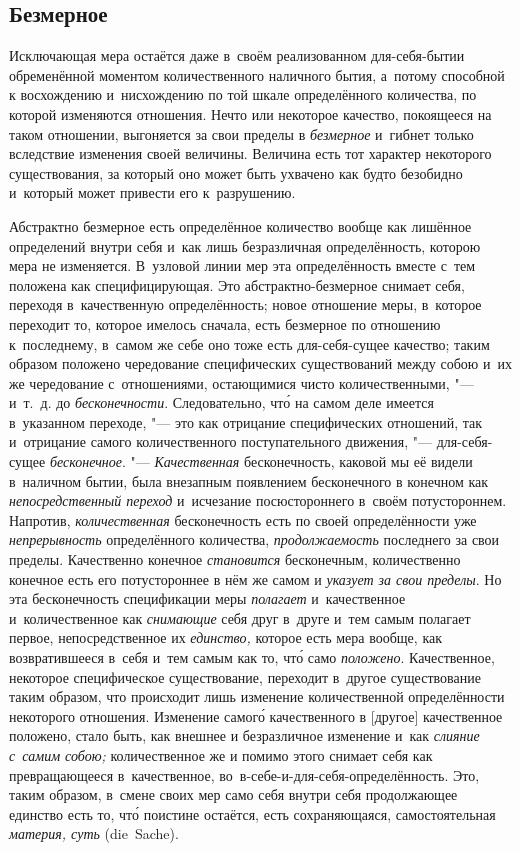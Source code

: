 \subsection{Безмерное}

Исключающая мера остаётся даже в~своём реализованном для-себя-бытии
обременённой моментом количественного наличного бытия, а~потому способной к
восхождению и~нисхождению по той шкале определённого количества, по которой
изменяются отношения. Нечто или некоторое качество, покоящееся на таком
отношении, выгоняется за свои пределы в {\em безмерное} и~гибнет только
вследствие изменения своей величины. Величина есть тот характер некоторого
существования, за который оно может быть ухвачено как будто безобидно и~который
может привести его к~разрушению.

Абстрактно безмерное есть определённое количество вообще как лишённое
определений внутри себя и~как лишь безразличная определённость, которою мера не
изменяется. В~узловой линии мер эта определённость вместе с~тем положена как
специфицирующая. Это абстрактно-безмерное снимает себя, переходя в~качественную
определённость; новое отношение меры, в~которое переходит то, которое имелось
сначала, есть безмерное по отношению к~последнему, в~самом же себе оно тоже
есть для-себя-сущее качество; таким образом положено чередование специфических
существований между собою и~их же чередование с~отношениями, остающимися чисто
количественными, "--- и~т.~д. до {\em бесконечности}. Следовательно, чт\'{о} на
самом деле имеется в~указанном переходе, "--- это как отрицание специфических
отношений, так и~отрицание самого количественного поступательного движения,
"--- для-себя-сущее {\em бесконечное}. "--- {\em Качественная} бесконечность,
каковой мы её видели в~наличном бытии, была внезапным появлением бесконечного в
конечном как {\em непосредственный переход} и~исчезание посюстороннего в~своём
потустороннем. Напротив, {\em количественная} бесконечность есть по своей
определённости уже {\em непрерывность} определённого количества,
{\em продолжаемость} последнего за свои пределы. Качественно конечное
{\em становится} бесконечным, количественно конечное есть его потустороннее в
нём же самом и {\em указует за свои пределы}. Но эта бесконечность спецификации
меры {\em полагает} и~качественное и~количественное как {\em снимающие} себя
друг в~друге и~тем самым полагает первое, непосредственное их {\em единство,}
которое есть мера вообще, как возвратившееся в~себя и~тем самым как то, чт\'{о}
само {\em положено}. Качественное, некоторое специфическое существование,
переходит в~другое существование таким образом, что происходит лишь изменение
количественной определённости некоторого отношения. Изменение самог\'{о}
качественного в [другое] качественное положено, стало быть, как внешнее и
безразличное изменение и~как {\em слияние с~самим собою;} количественное же и
помимо этого снимает себя как превращающееся в~качественное,
во~в-себе-и-для-себя-определённость. Это, таким образом, в~смене своих мер само
себя внутри себя продолжающее единство есть то, чт\'{о} поистине остаётся, есть
сохраняющаяся, самостоятельная {\em материя, суть} (die~Sache).


